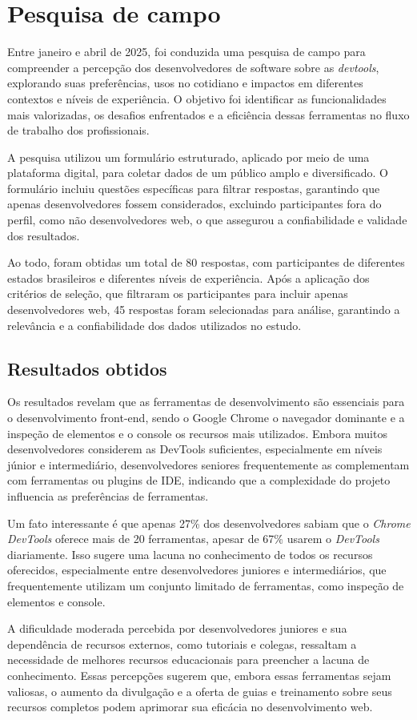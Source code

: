 \chapter{Pesquisa de campo}
Entre janeiro e abril de 2025, foi conduzida uma pesquisa de campo para compreender a percepção dos desenvolvedores de software sobre as \textit{devtools}, explorando suas preferências, usos no cotidiano e impactos em diferentes contextos e níveis de experiência. O objetivo foi identificar as funcionalidades mais valorizadas, os desafios enfrentados e a eficiência dessas ferramentas no fluxo de trabalho dos profissionais.

A pesquisa utilizou um formulário estruturado, aplicado por meio de uma plataforma digital, para coletar dados de um público amplo e diversificado. O formulário incluiu questões específicas para filtrar respostas, garantindo que apenas desenvolvedores fossem considerados, excluindo participantes fora do perfil, como não desenvolvedores web, o que assegurou a confiabilidade e validade dos resultados.

Ao todo, foram obtidas um total de 80 respostas, com participantes de diferentes estados brasileiros e diferentes níveis de experiência. Após a aplicação dos critérios de seleção, que filtraram os participantes para incluir apenas desenvolvedores web, 45 respostas foram selecionadas para análise, garantindo a relevância e a confiabilidade dos dados utilizados no estudo. 

\section{Resultados obtidos}
Os resultados revelam que as ferramentas de desenvolvimento são essenciais para o desenvolvimento front-end, sendo o Google Chrome o navegador dominante e a inspeção de elementos e o console os recursos mais utilizados. Embora muitos desenvolvedores considerem as DevTools suficientes, especialmente em níveis júnior e intermediário, desenvolvedores seniores frequentemente as complementam com ferramentas ou plugins de IDE, indicando que a complexidade do projeto influencia as preferências de ferramentas. 

Um fato interessante é que apenas 27\% dos desenvolvedores sabiam que o \textit{Chrome DevTools} oferece mais de 20 ferramentas, apesar de 67\% usarem o \textit{DevTools} diariamente. Isso sugere uma lacuna no conhecimento de todos os recursos oferecidos, especialmente entre desenvolvedores juniores e intermediários, que frequentemente utilizam um conjunto limitado de ferramentas, como inspeção de elementos e console.

A dificuldade moderada percebida por desenvolvedores juniores e sua dependência de recursos externos, como tutoriais e colegas, ressaltam a necessidade de melhores recursos educacionais para preencher a lacuna de conhecimento. Essas percepções sugerem que, embora essas ferramentas sejam valiosas, o aumento da divulgação e a oferta de guias e treinamento sobre seus recursos completos podem aprimorar sua eficácia no desenvolvimento web.